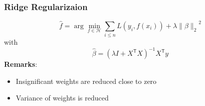 \subsubsection{Ridge Regularizaion}
\noindent\begin{equation*}
    \widehat{f} =\arg\min_{f\in\mathcal{H}}\sum_{i\leq n}L(y_{i},f(x_{i})) + \lambda{\|\beta\|_2}^2
\end{equation*}
with 
\noindent\begin{equation*}
    \hat{\beta}={(\lambda I+X^{\mathsf{T}}X)}^{-1}X^{\mathsf{T}}y
\end{equation*}
\textbf{Remarks}:
\begin{itemize}
    \item Insignificant weights are reduced close to zero
    \item Variance of weights is reduced
\end{itemize}